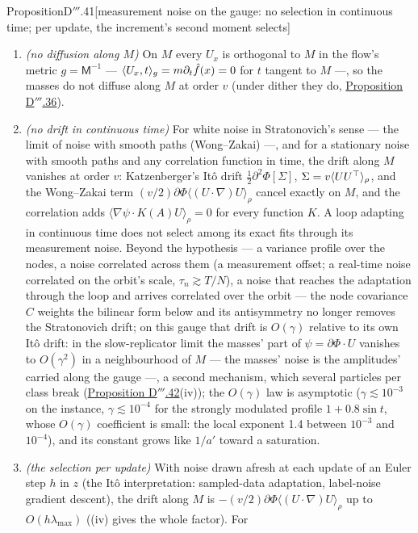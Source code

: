 \begin{thm}{Proposition}{D$'''$.41}[measurement noise on the gauge: no selection in continuous time; per update, the
increment's second moment selects]
\begin{enumerate}[label=\textup{(\roman*)}]
  \item \emph{(no diffusion along $M$)} On $M$ every $U_x$ is orthogonal to $M$ in the flow's metric
    $g = \mathsf M^{-1}$ --- $\langle U_x,t\rangle_g = m\partial_t\hat f(x) = 0$ for $t$ tangent to $M$ ---, so the masses
    do not diffuse along $M$ at order $v$ (under dither they do, \hyperref[res:thmDppp:36]{Proposition D$'''$.36}).
  \item \emph{(no drift in continuous time)} For white noise in Stratonovich's sense --- the limit of noise with smooth
    paths (Wong--Zakai) ---, and for a stationary noise with smooth paths and any correlation function in time, the
    drift along $M$ vanishes at order $v$: Katzenberger's It\^o drift $\tfrac12\partial^2\Phi[\Sigma]$,
    $\Sigma = v\langle UU^\top\rangle_\rho$, and the Wong--Zakai term $(v/2)\partial\Phi\langle(U\cdot\nabla)U\rangle_\rho$
    cancel exactly on $M$, and the correlation adds $\langle\nabla\psi\cdot K(A)U\rangle_\rho = 0$ for every function
    $K$. A loop adapting in continuous time does not select among its exact fits through its measurement noise. Beyond
    the hypothesis --- a variance profile over the nodes, a noise correlated across them (a measurement offset; a
    real-time noise correlated on the orbit's scale, $\tau_n\gtrsim T/N$), a noise that reaches the adaptation through
    the loop and arrives correlated over the orbit --- the node covariance $C$ weights the bilinear form below and its
    antisymmetry no longer removes the Stratonovich drift; on this gauge that drift is $O(\gamma)$ relative to its own
    It\^o drift: in the slow-replicator limit the masses' part of $\psi = \partial\Phi\cdot U$ vanishes to
    $O(\gamma^2)$ in a neighbourhood of $M$ --- the masses' noise is the amplitudes' carried along the gauge ---, a
    second mechanism, which several particles per class break (\hyperref[res:thmDppp:42]{Proposition D$'''$.42}(iv));
    the $O(\gamma)$ law is asymptotic ($\gamma\lesssim10^{-3}$ on the instance, $\gamma\lesssim10^{-4}$ for the strongly
    modulated profile $1 + 0.8\sin t$, whose $O(\gamma)$ coefficient is small: the local exponent 1.4 between $10^{-3}$
    and $10^{-4}$), and its constant grows like $1/a'$ toward a saturation.
  \item \emph{(the selection per update)} With noise drawn afresh at each update of an Euler step $h$ in $z$ (the It\^o
    interpretation: sampled-data adaptation, label-noise gradient descent), the drift along $M$ is
    $-(v/2)\partial\Phi\langle(U\cdot\nabla)U\rangle_\rho$ up to $O(h\lambda_{\max})$ ((iv) gives the whole factor). For

\end{enumerate}
\end{thm}
